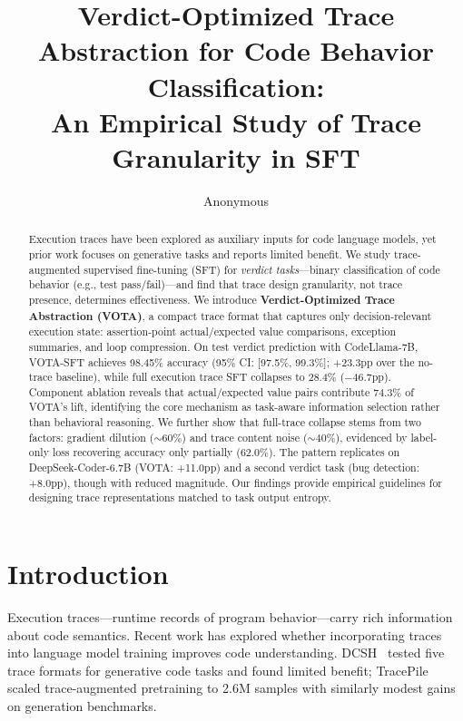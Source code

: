 \documentclass[11pt]{article}
\title{Verdict-Optimized Trace Abstraction for Code Behavior Classification:\\An Empirical Study of Trace Granularity in SFT}
\author{Anonymous}
\date{}
\begin{document}
\maketitle

\begin{abstract}
Execution traces have been explored as auxiliary inputs for code language models, yet prior work focuses on generative tasks and reports limited benefit.
We study trace-augmented supervised fine-tuning (SFT) for \emph{verdict tasks}---binary classification of code behavior (e.g., test pass/fail)---and find that trace design granularity, not trace presence, determines effectiveness.
We introduce \textbf{Verdict-Optimized Trace Abstraction (VOTA)}, a compact trace format that captures only decision-relevant execution state: assertion-point actual/expected value comparisons, exception summaries, and loop compression.
On test verdict prediction with CodeLlama-7B, VOTA-SFT achieves 98.45\% accuracy (95\% CI: [97.5\%, 99.3\%]; +23.3pp over the no-trace baseline), while full execution trace SFT collapses to 28.4\% ($-$46.7pp).
Component ablation reveals that actual/expected value pairs contribute 74.3\% of VOTA's lift, identifying the core mechanism as task-aware information selection rather than behavioral reasoning.
We further show that full-trace collapse stems from two factors: gradient dilution ($\sim$60\%) and trace content noise ($\sim$40\%), evidenced by label-only loss recovering accuracy only partially (62.0\%).
The pattern replicates on DeepSeek-Coder-6.7B (VOTA: +11.0pp) and a second verdict task (bug detection: +8.0pp), though with reduced magnitude.
Our findings provide empirical guidelines for designing trace representations matched to task output entropy.
\end{abstract}

\section{Introduction}

Execution traces---runtime records of program behavior---carry rich information about code semantics. Recent work has explored whether incorporating traces into language model training improves code understanding. DCSH~\citep{ding2024trace} tested five trace formats for generative code tasks and found limited benefit; TracePile~\citep{tracepile2025} scaled trace-augmented pretraining to 2.6M samples with similarly modest gains on generation benchmarks.
\end{document}
